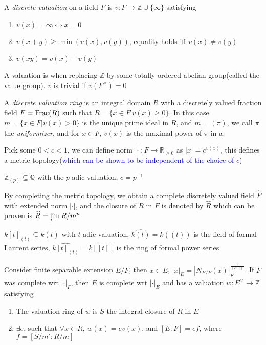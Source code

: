 \documentclass[a4paper,10pt]{article}
\begin{document}
\begin{definition}
A \textit{discrete valuation} on a field $F$ is $v:F\to\mathbb Z\cup\{\infty\}$ satisfying
\begin{enumerate}
\item $v(x)=\infty\iff x=0$
\item $v(x+y)\geq\min(v(x),v(y))$, equality holds iff $v(x)\neq v(y)$
\item $v(xy)=v(x)+v(y)$
\end{enumerate}
A valuation is when replacing $\mathbb Z$ by some totally ordered abelian group(called the value group). $v$ is trivial if $v(F^\times)=0$
\end{definition}

\begin{definition}
A \textit{discrete valuation ring} is an integral domain $R$ with a discretely valued fraction field $F=\operatorname{Frac}(R)$ such that $R=\{x\in F|v(x)\geq0\}$. In this case $m=\{x\in F|v(x)>0\}$ is the unique prime ideal in $R$, and $m=(\pi)$, we call $\pi$ the \textit{uniformizer}, and for $x\in F$, $v(x)$ is the maximal power of $\pi$ in $a$.
\end{definition}

\begin{definition}
Pick some $0<c<1$, we can define norm $|\cdot|:F\to\mathbb R_{\geq0}$ as $|x|=c^{v(x)}$, this defines a metric topology(\textcolor{blue}{which can be shown to be independent of the choice of $c$})
\end{definition}

\begin{example}
$\mathbb Z_{(p)}\subseteq \mathbb Q$ with the $p$-adic valuation, $c=p^{-1}$
\end{example}

\begin{definition}
By completing the metric topology, we obtain a complete discretely valued field $\widehat F$ with extended norm $|\cdot|$, and the closure of $R$ in $F$ is denoted by $\widehat R$ which can be proven is $\widehat R=\varprojlim R/m^n$
\end{definition}

\begin{example}
$k[t]_{(t)}\subseteq k(t)$ with $t$-adic valuation, $\widehat{k(t)}=k((t))$ is the field of formal Laurent series, $\widehat{k[t]_{(t)}}=k[[t]]$ is the ring of formal power series
\end{example}

\begin{definition}
Consider finite separable extension $E/F$, then $x\in E$, $|x|_E=|N_{E/F}(x)|_F^{\frac{1}{|[E:F]|}}$. If $F$ was complete wrt $|\cdot|_F$, then $E$ is complete wrt $|\cdot|_E$ and has a valuation $w:E^\times\to\mathbb Z$ satisfying
\begin{enumerate}
\item The valuation ring of $w$ is $S$ the integral closure of $R$ in $E$
\item $\exists e$, such that $\forall x\in R$, $w(x)=ev(x)$, and $[E:F]=ef$, where $f=[S/m':R/m]$
\end{enumerate}
\end{definition}
\end{document}
